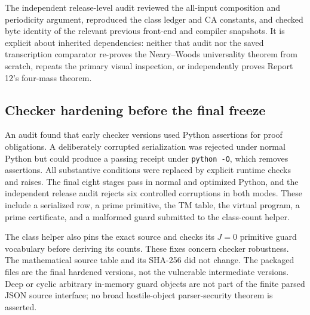 \documentclass[11pt,a4paper]{article}
\numberwithin{equation}{section}
\newcommand{\code}[1]{\texttt{\small #1}}
\begin{document}
The independent release-level audit reviewed the all-input composition and
periodicity argument, reproduced the class ledger and CA constants, and
checked byte identity of the relevant previous front-end and compiler
snapshots. It is explicit about inherited dependencies: neither that audit
nor the saved transcription comparator re-proves the Neary--Woods universality
theorem from scratch, repeats the primary visual inspection, or independently
proves Report 12's four-mass theorem.

\subsection{Checker hardening before the final freeze}
An audit found that early checker versions used Python assertions for proof
obligations. A deliberately corrupted serialization was rejected under
normal Python but could produce a passing receipt under \code{python -O},
which removes assertions. All substantive conditions were replaced by
explicit runtime checks and raises. The final eight stages pass in normal
and optimized Python, and the independent release audit rejects six controlled
corruptions in both modes. These include a serialized row, a prime primitive,
the TM table, the virtual program, a prime certificate, and a malformed guard
submitted to the class-count helper.

The class helper also pins the exact source and checks its $J=0$ primitive
guard vocabulary before deriving its counts. These fixes concern checker
robustness. The mathematical source table and its SHA-256 did not change.
The packaged files are the final hardened versions, not the vulnerable
intermediate versions. Deep or cyclic arbitrary in-memory guard objects are
not part of the finite parsed JSON source interface; no broad hostile-object
parser-security theorem is asserted.
\end{document}
